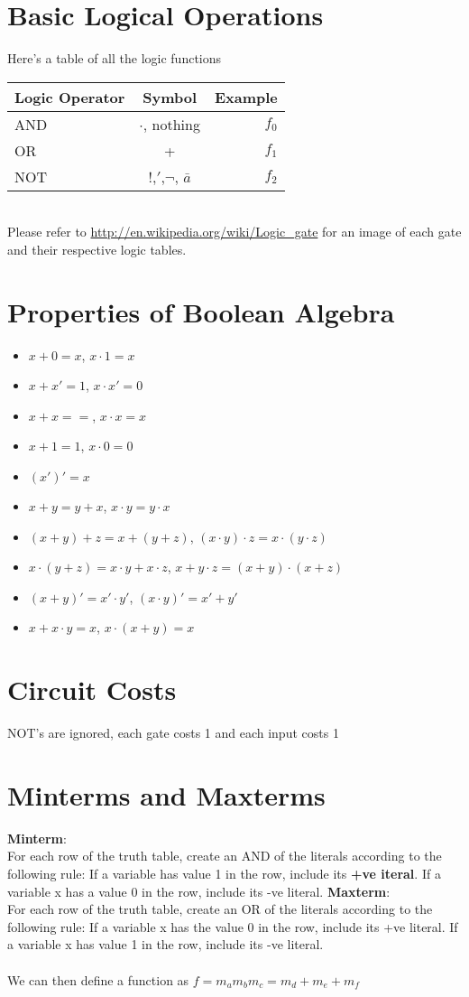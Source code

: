\documentclass[12pt]{report}
\begin{document}
	\section{Basic Logical Operations}
		Here's a table of all the logic functions\\
		\begin{tabular}{ l | c || r }
			\hline
			Logic Operator & Symbol & Example \\
			\hline
			AND & $\cdot$, nothing 			& $f_0$ \\
			OR 	& + 						& $f_1$ \\
			NOT & !,$'$,$\neg$, $\bar{a}$	& $f_2$ \\
		\end{tabular}
		\\
		Please refer to \url{http://en.wikipedia.org/wiki/Logic_gate} for an image of each gate and their respective logic tables.
	\section{Properties of Boolean Algebra}
		\begin{itemize}
			\item $x + 0 = x$, $x \cdot 1 = x$
			\item $x + x' = 1$, $x \cdot x' = 0$
			\item $x + x = =$, $x \cdot x = x$
			\item $x + 1 = 1$, $x \cdot 0 = 0$
			\item $(x')' = x$
			\item $x + y = y + x$, $x \cdot y = y \cdot x$
			\item $(x + y) + z = x + (y + z)$, $(x\cdot y)\cdot z = x \cdot (y \cdot z)$
			\item $x\cdot (y + z) = x\cdot y + x\cdot z$, $x + y\cdot z = (x+y)\cdot(x+z)$
			\item $(x + y)' = x' \cdot y'$, $(x\cdot y)' = x' + y'$
			\item $x + x\cdot y = x$, $ x\cdot (x + y) = x$
		\end{itemize}
	\section{Circuit Costs}
		NOT's are ignored, each gate costs 1 and each input costs 1
	\section{Minterms and Maxterms}
		\textbf{Minterm}:\\
		For each row of the truth table, create an AND of the literals according to the following rule: If a variable has value 1 in the row, include its \textbf{+ve iteral}. If a variable x has a value 0 in the row, include its -ve literal.
		\textbf{Maxterm}:\\
		For each row of the truth table, create an OR of the literals according to the following rule: If a variable x has the value 0 in the row, include its +ve literal. If a variable x has value 1 in the row, include its -ve literal. 
		\\
		\\
		We can then define a function as $f = m_am_bm_c = m_d + m_e + m_f$
\end{document}
